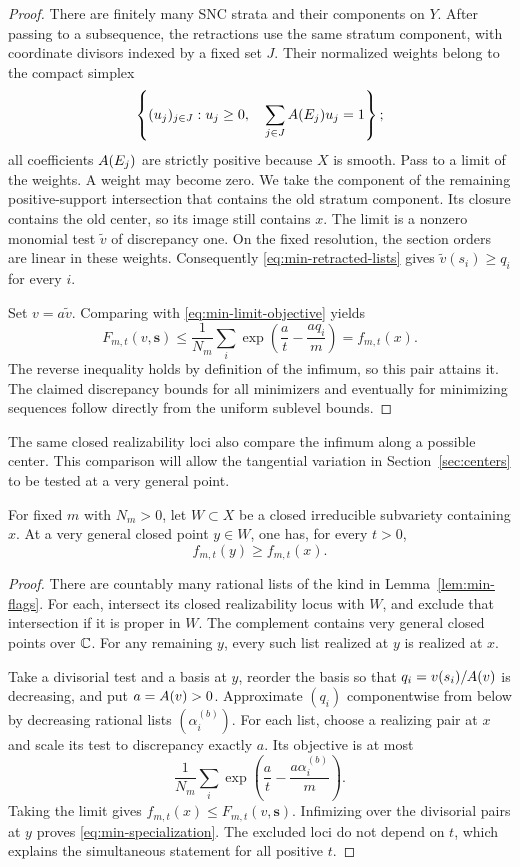 \begin{proof}
There are finitely many SNC strata and their components on $Y$.
After passing to a subsequence, the retractions use the same stratum
component, with coordinate divisors indexed by a fixed set $J$.
Their normalized weights belong to the compact simplex
\[
 \left\{(u_j)_{j\in J}:u_j\geq0,\quad
                \sum_{j\in J}A(E_j)u_j=1\right\};
\]
all coefficients $A(E_j)$ are strictly positive because $X$ is
smooth. Pass to a limit of the weights. A weight may become zero.
We take the component of the remaining positive-support intersection
that contains the old stratum component. Its closure contains the old
center, so its image still contains $x$.
The limit is a nonzero monomial test $\widetilde v$
of discrepancy one. On the fixed resolution, the section orders are
linear in these weights. Consequently
\eqref{eq:min-retracted-lists} gives
$\widetilde v(s_i)\geq q_i$ for every $i$.

Set $v=a\widetilde v$. Comparing with
\eqref{eq:min-limit-objective} yields
\[
 F_{m,t}(v,\mathbf s)
 \leq\frac1{N_m}\sum_i
       \exp\!\left(\frac at-\frac{aq_i}m\right)
 =f_{m,t}(x).
\]
The reverse inequality holds by definition of the infimum, so this
pair attains it. The claimed discrepancy bounds for all minimizers
and eventually for minimizing sequences follow directly from the
uniform sublevel bounds.
\end{proof}

The same closed realizability loci also compare the infimum along a
possible center. This comparison will allow the tangential variation in
Section~\ref{sec:centers} to be tested at a very general point.

\begin{lemma}
\label{lem:specialization}
For fixed $m$ with $N_m>0$, let $W\subset X$ be a closed irreducible
subvariety containing $x$. At a very general closed point $y\in W$,
one has, for every $t>0$,
\begin{equation}
\label{eq:min-specialization}
 f_{m,t}(y)\geq f_{m,t}(x).
\end{equation}
\end{lemma}

\begin{proof}
There are countably many rational lists of the kind in
Lemma~\ref{lem:min-flags}. For each, intersect its closed realizability
locus with $W$, and exclude that intersection if it is proper in $W$.
The complement contains very general closed points over $\mathbb C$.
For any remaining $y$, every such list realized at $y$ is realized
at $x$.

Take a divisorial test and a basis at $y$, reorder the basis so that
$q_i=v(s_i)/A(v)$ is decreasing, and put $a=A(v)>0$. Approximate
$(q_i)$ componentwise from below by decreasing rational lists
$(\alpha_i^{(b)})$. For each list, choose a realizing pair at $x$ and
scale its test to discrepancy exactly $a$. Its objective is at most
\[
 \frac1{N_m}\sum_i
       \exp\!\left(\frac at-\frac{a\alpha_i^{(b)}}m\right).
\]
Taking the limit gives $f_{m,t}(x)\leq F_{m,t}(v,\mathbf s)$.
Infimizing over the divisorial pairs at $y$ proves
\eqref{eq:min-specialization}. The excluded loci do not depend on
$t$, which explains the simultaneous statement for all positive $t$.
\end{proof}
